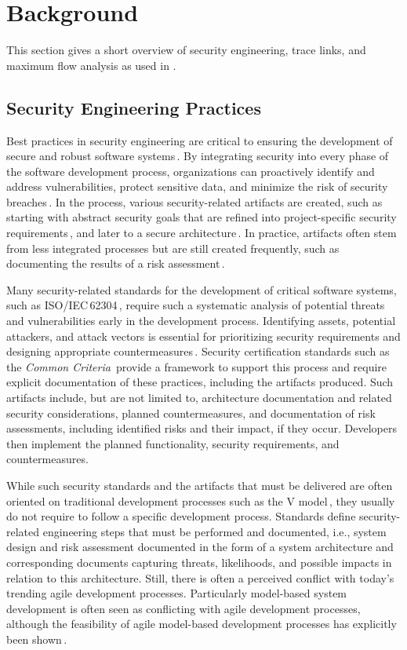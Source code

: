 \section{Background}
\label{sec:background}

This section gives a short overview of security engineering, trace links, and maximum flow analysis as used in \appr.

\subsection{Security Engineering Practices}
Best practices in security engineering are critical to ensuring the development of secure and robust software systems\,\cite{1281254}.
By integrating security into every phase of the software development process, organizations can proactively identify and address vulnerabilities, protect sensitive data, and minimize the risk of security breaches\,\cite{9669954}.
In the process, various security-related artifacts are created, such as starting with abstract security goals that are refined into project-specific security requirements\,\cite{turpe2017trouble}, and later to a secure architecture\,\cite{4359475}.
In practice, artifacts often stem from less integrated processes but are still created frequently, such as documenting the results of a risk assessment\,\cite{SHAMELISENDI201614,BRUNNER2020101776}.

Many security-related standards for the development of critical software systems, such as ISO/IEC\,62304\,\cite{IEC62304}, require such a systematic analysis of potential threats and vulnerabilities early in the development process.
Identifying assets, potential attackers, and attack vectors is essential for prioritizing security requirements and designing appropriate countermeasures\,\cite{TUMA2018275}.
Security certification standards such as the \emph{Common Criteria}\,\cite{cc} provide a framework to support this process and require explicit documentation of these practices, including the artifacts produced. Such artifacts include, but are not limited to, architecture documentation and related security considerations, planned countermeasures, and documentation of risk assessments, including identified risks and their impact, if they occur.
Developers then implement the planned functionality, security requirements, and countermeasures.

While such security standards and the artifacts that must be delivered are often oriented on traditional development processes such as the V model\,\cite{MuellerEttrich1997}, they usually do not require to follow a specific development process.
Standards define security-related engineering steps that must be performed and documented, i.e., system design and risk assessment documented in the form of a system architecture and corresponding documents capturing threats, likelihoods, and possible impacts in relation to this architecture.
Still, there is often a perceived conflict with today's trending agile development processes.
Particularly model-based system development is often seen as conflicting with agile development processes, although the feasibility of agile model-based development processes has explicitly been shown\,\cite{Gray2018}.

